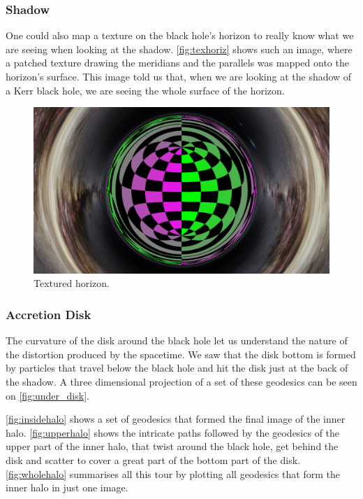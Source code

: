 \subsubsection*{Shadow}

One could also map a texture on the black hole's horizon to really know what we are seeing when looking at the shadow. \autoref{fig:texhoriz} shows such an image, where a patched texture drawing the meridians and the parallels was mapped onto the horizon's surface. This image told us that, when we are looking at the shadow of a Kerr black hole, we are seeing the whole surface of the horizon.

\begin{figure}[bth]
	\myfloatalign
	\includegraphics[width=.8\linewidth]{gfx/gridhorizon}
	\caption[Textured horizon]{Textured horizon.}
	\label{fig:texhoriz}
\end{figure}

\subsubsection*{Accretion Disk}

The curvature of the disk around the black hole let us understand the nature of the distortion produced by the spacetime. We saw that the disk bottom is formed by particles that travel below the black hole and hit the disk just at the back of the shadow. A three dimensional projection of a set of these geodesics can be seen on \autoref{fig:under_disk}.

\autoref{fig:insidehalo} shows a set of geodesics that formed the final image of the inner halo. \autoref{fig:upperhalo} shows the intricate paths followed by the geodesics of the upper part of the inner halo, that twist around the black hole, get behind the disk and scatter to cover a great part of the bottom part of the disk. \autoref{fig:wholehalo} summarises all this tour by plotting all geodesics that form the inner halo in just one image.

